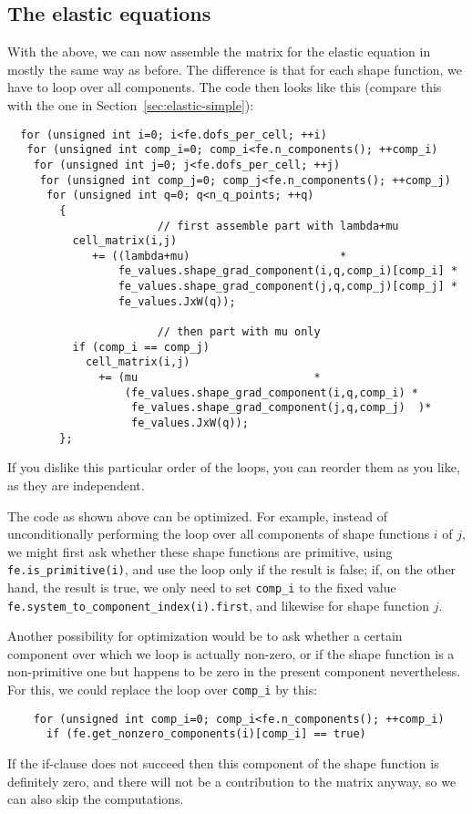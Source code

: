 \documentclass{article}
\begin{document}
\subsection{The elastic equations}

With the above, we can now assemble the matrix for the elastic equation in
mostly the same way as before. The difference is that for each shape function,
we have to loop over all components. The code then looks like this (compare
this with the one in Section~\ref{sec:elastic-simple}):
\begin{verbatim}
  for (unsigned int i=0; i<fe.dofs_per_cell; ++i)
   for (unsigned int comp_i=0; comp_i<fe.n_components(); ++comp_i)
    for (unsigned int j=0; j<fe.dofs_per_cell; ++j)
     for (unsigned int comp_j=0; comp_j<fe.n_components(); ++comp_j)
      for (unsigned int q=0; q<n_q_points; ++q) 
        {
                       // first assemble part with lambda+mu
          cell_matrix(i,j)
             += ((lambda+mu)                       *
                 fe_values.shape_grad_component(i,q,comp_i)[comp_i] * 
                 fe_values.shape_grad_component(j,q,comp_j)[comp_j] *
                 fe_values.JxW(q)); 

                       // then part with mu only
          if (comp_i == comp_j)
            cell_matrix(i,j)
              += (mu                           *
                  (fe_values.shape_grad_component(i,q,comp_i) * 
                   fe_values.shape_grad_component(j,q,comp_j)  )*
                   fe_values.JxW(q)); 
        };
\end{verbatim}
If you dislike this particular order of the loops, you can reorder them as you
like, as they are independent.

The code as shown above can be optimized. For example, instead of
unconditionally performing the loop over all components of shape functions $i$
of $j$, we might first ask whether these shape functions are primitive, using
\texttt{fe.is\_primitive(i)}, and use the loop only if the result is false;
if, on the other hand, the result is true, we only need to set
\texttt{comp\_i} to the fixed value
\texttt{fe.system\_to\_component\_index(i).first}, and likewise for shape
function $j$.

Another possibility for optimization would be to ask whether a certain
component over which we loop is actually non-zero, or if the shape function is
a non-primitive one but happens to be zero in the present component
nevertheless. For this, we could replace the loop over \texttt{comp\_i} by
this:
\begin{verbatim}
    for (unsigned int comp_i=0; comp_i<fe.n_components(); ++comp_i)
      if (fe.get_nonzero_components(i)[comp_i] == true)
\end{verbatim}
If the if-clause does not succeed then this component of the shape function is
definitely zero, and there will not be a contribution to the matrix anyway, so
we can also skip the computations.
\end{document}
